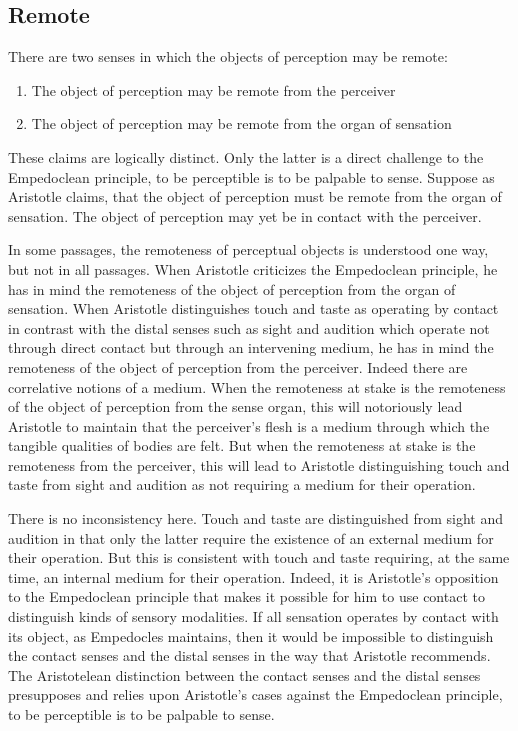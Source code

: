 
\subsection{Remote} %
\label{sub:remote}

There are two senses in which the objects of perception may be remote:
\begin{enumerate}[(1)]
	\item The object of perception may be remote from the perceiver
	\item The object of perception may be remote from the organ of sensation
\end{enumerate}
These claims are logically distinct. Only the latter is a direct challenge to the Empedoclean principle, to be perceptible is to be palpable to sense. Suppose as Aristotle claims, that the object of perception must be remote from the organ of sensation. The object of perception may yet be in contact with the perceiver.

In some passages, the remoteness of perceptual objects is understood one way, but not in all passages. When Aristotle criticizes the Empedoclean principle, he has in mind the remoteness of the object of perception from the organ of sensation. When Aristotle distinguishes touch and taste as operating by contact in contrast with the distal senses such as sight and audition which operate not through direct contact but through an intervening medium, he has in mind the remoteness of the object of perception from the perceiver. Indeed there are correlative notions of a medium. When the remoteness at stake is the remoteness of the object of perception from the sense organ, this will notoriously lead Aristotle to maintain that the perceiver's flesh is a medium through which the tangible qualities of bodies are felt. But when the remoteness at stake is the remoteness from the perceiver, this will lead to Aristotle distinguishing touch and taste from sight and audition as not requiring a medium for their operation. 

There is no inconsistency here. Touch and taste are distinguished from sight and audition in that only the latter require the existence of an external medium for their operation. But this is consistent with touch and taste requiring, at the same time, an internal medium for their operation. Indeed, it is Aristotle's opposition to the Empedoclean principle that makes it possible for him to use contact to distinguish kinds of sensory modalities. If all sensation operates by contact with its object, as Empedocles maintains, then it would be impossible to distinguish the contact senses and the distal senses in the way that Aristotle recommends. The Aristotelean distinction between the contact senses and the distal senses presupposes and relies upon Aristotle's cases against the Empedoclean principle, to be perceptible is to be palpable to sense.

